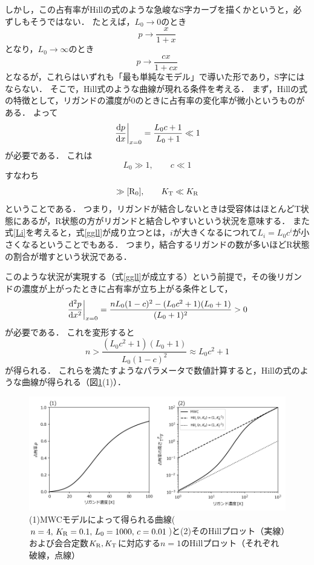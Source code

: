しかし，この占有率がHillの式のような急峻なS字カーブを描くかというと，必ずしもそうではない．
たとえば，$L_0 \to 0$のとき
\begin{equation}
  p \to \frac{x}{1+x}
\end{equation}
となり，$L_0 \to \infty$のとき
\begin{equation}
  p \to \frac{cx}{1+cx}
\end{equation}
となるが，これらはいずれも「最も単純なモデル」で導いた形であり，S字にはならない．
そこで，Hill式のような曲線が現れる条件を考える．
まず，Hillの式の特徴として，リガンドの濃度が0のときに占有率の変化率が微小というものがある．
よって
\begin{equation}
  \left.\dv{p}{x}\right|_{x=0} = \frac{L_0 c + 1}{L_0 + 1} \ll 1
\end{equation}
が必要である．
これは
\begin{equation}
  L_0 \gg 1 , \qquad c \ll 1 \label{ggll}
\end{equation}
すなわち
\begin{equation}
  [\ce{T_0}] \gg [\ce{R_0}] ,\qquad K_{\ce{T}} \ll K_{\ce{R}}
\end{equation}
ということである．
つまり，リガンドが結合しないときは受容体はほとんどT状態にあるが，R状態の方がリガンドと結合しやすいという状況を意味する．
また式\eqref{Li}を考えると，式\eqref{ggll}が成り立つとは，$i$が大きくなるにつれて$L_i=L_0c^i$が小さくなるということでもある．
つまり，結合するリガンドの数が多いほどR状態の割合が増すという状況である．

このような状況が実現する（式\eqref{ggll}が成立する）という前提で，その後リガンドの濃度が上がったときに占有率が立ち上がる条件として，
\begin{equation}
  \left.\dv[2]{p}{x}\right|_{x=0} = \frac{nL_0 (1-c)^2 - (L_0 c^2 + 1)(L_0 + 1)}{(L_0 + 1)^2} > 0 
\end{equation}
が必要である．
これを変形すると
\begin{equation}
  n > \frac{(L_0 c^2 + 1)(L_0 + 1)}{L_0 (1-c)^2} \approx L_0 c^2 + 1 \label{ng}
\end{equation}
が得られる．
これらを満たすようなパラメータで数値計算すると，Hillの式のような曲線が得られる（図\ref{fig:mwc}(1)）．


\begin{figure}[htbp]
  \centering
  \includegraphics[width=14cm]{mwc.png}
  \caption{(1)MWCモデルによって得られる曲線($n = 4,\, K_{\ce{R}} = 0.1,\, L_0 = 1000,\, c = 0.01$)と(2)そのHillプロット（実線）および会合定数$K_{\ce{R}},K_{\ce{T}}$に対応する$n=1$のHillプロット（それぞれ破線，点線）}
  \label{fig:mwc}
\end{figure}

